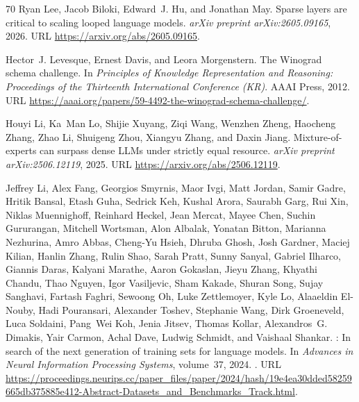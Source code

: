 \documentclass[]{bytedance_seed}
\theoremstyle{definition}
\theoremstyle{remark}
\begin{document}
\begin{thebibliography}{70}
Ryan Lee, Jacob Biloki, Edward~J. Hu, and Jonathan May.
\newblock Sparse layers are critical to scaling looped language models.
\newblock \emph{arXiv preprint arXiv:2605.09165}, 2026.
\newblock URL \url{https://arxiv.org/abs/2605.09165}.

Hector~J. Levesque, Ernest Davis, and Leora Morgenstern.
\newblock The {W}inograd schema challenge.
\newblock In \emph{Principles of Knowledge Representation and Reasoning:
  Proceedings of the Thirteenth International Conference (KR)}. {AAAI} Press,
  2012.
\newblock URL
  \url{https://aaai.org/papers/59-4492-the-winograd-schema-challenge/}.

Houyi Li, Ka~Man Lo, Shijie Xuyang, Ziqi Wang, Wenzhen Zheng, Haocheng Zhang,
  Zhao Li, Shuigeng Zhou, Xiangyu Zhang, and Daxin Jiang.
\newblock Mixture-of-experts can surpass dense {LLM}s under strictly equal
  resource.
\newblock \emph{arXiv preprint arXiv:2506.12119}, 2025.
\newblock URL \url{https://arxiv.org/abs/2506.12119}.

Jeffrey Li, Alex Fang, Georgios Smyrnis, Maor Ivgi, Matt Jordan, Samir Gadre,
  Hritik Bansal, Etash Guha, Sedrick Keh, Kushal Arora, Saurabh Garg, Rui Xin,
  Niklas Muennighoff, Reinhard Heckel, Jean Mercat, Mayee Chen, Suchin
  Gururangan, Mitchell Wortsman, Alon Albalak, Yonatan Bitton, Marianna
  Nezhurina, Amro Abbas, Cheng-Yu Hsieh, Dhruba Ghosh, Josh Gardner, Maciej
  Kilian, Hanlin Zhang, Rulin Shao, Sarah Pratt, Sunny Sanyal, Gabriel Ilharco,
  Giannis Daras, Kalyani Marathe, Aaron Gokaslan, Jieyu Zhang, Khyathi Chandu,
  Thao Nguyen, Igor Vasiljevic, Sham Kakade, Shuran Song, Sujay Sanghavi,
  Fartash Faghri, Sewoong Oh, Luke Zettlemoyer, Kyle Lo, Alaaeldin El-Nouby,
  Hadi Pouransari, Alexander Toshev, Stephanie Wang, Dirk Groeneveld, Luca
  Soldaini, Pang~Wei Koh, Jenia Jitsev, Thomas Kollar, Alexandros~G. Dimakis,
  Yair Carmon, Achal Dave, Ludwig Schmidt, and Vaishaal Shankar.
: In search of the next generation of training sets for
  language models.
\newblock In \emph{Advances in Neural Information Processing Systems},
  volume~37, 2024{}.
\newblock {}.
\newblock URL
  \url{https://proceedings.neurips.cc/paper_files/paper/2024/hash/19e4ea30dded58259665db375885e412-Abstract-Datasets_and_Benchmarks_Track.html}.


\end{thebibliography}
\end{document}
